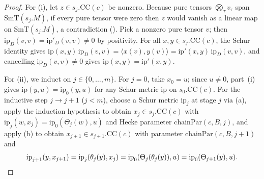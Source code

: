 \documentclass[11pt]{amsart}
\theoremstyle{plain}
\theoremstyle{definition}
\numberwithin{equation}{section}
\begin{document}
\begin{proof}
For (i), let $z\in s_j.\mathrm{CC}(c)$ be nonzero. Because pure tensors $\bigotimes_\tau v_\tau$
span $\mathrm{SmT}(s_j.M)$, if every pure tensor were zero then $z$ would vanish as a linear map on
$\mathrm{SmT}(s_j.M)$, a contradiction (). Pick a nonzero pure
tensor $v$; then $\mathrm{ip}_D(v,v)=\mathrm{ip}'_D(v,v)\neq 0$ by positivity. For all
$x,y\in s_j.\mathrm{CC}(c)$, the Schur identity gives
$\mathrm{ip}(x,y)\,\mathrm{ip}_D(v,v)=\langle x(v),y(v)\rangle=\mathrm{ip}'(x,y)\,\mathrm{ip}_D(v,v)$,
and cancelling $\mathrm{ip}_D(v,v)\neq 0$ gives $\mathrm{ip}(x,y)=\mathrm{ip}'(x,y)$.

For (ii), we induct on $j\in\{0,\dots,m\}$. For $j=0$, take $x_0=u$; since $u\neq 0$, part~(i)
gives $\mathrm{ip}(y,u)=\mathrm{ip}_0(y,u)$ for any Schur metric $\mathrm{ip}$ on
$s_0.\mathrm{CC}(c)$. For the inductive step $j\to j+1$ ($j<m$), choose a Schur metric
$\mathrm{ip}_j$ at stage $j$ via (a), apply the induction hypothesis to obtain
$x_j\in s_j.\mathrm{CC}(c)$ with $\mathrm{ip}_j(w,x_j)=\mathrm{ip}_0(\Theta_j(w),u)$ and Hecke
parameter $\mathrm{chainPar}(c,B,j)$, and apply (b) to obtain $x_{j+1}\in s_{j+1}.\mathrm{CC}(c)$
with parameter $\mathrm{chainPar}(c,B,j+1)$ and
\[
\mathrm{ip}_{j+1}(y,x_{j+1})=\mathrm{ip}_j(\theta_j(y),x_j)=\mathrm{ip}_0(\Theta_j(\theta_j(y)),u)
=\mathrm{ip}_0(\Theta_{j+1}(y),u). \qedhere
\]
\end{proof}
\end{document}
